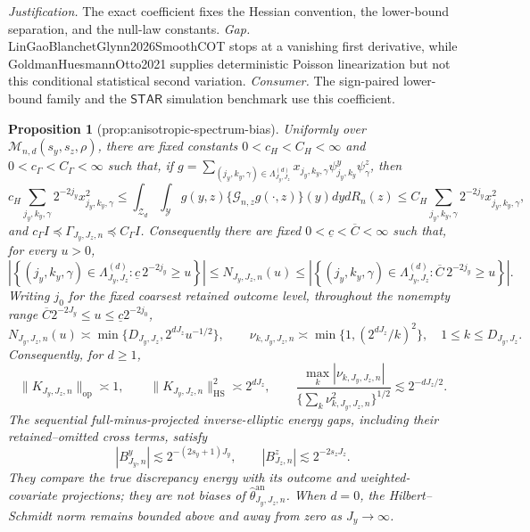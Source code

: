 \documentclass{article}
\newtheorem{proposition}{Proposition}
\begin{document}
\par\smallskip\noindent \textit{Justification.} The exact coefficient fixes the Hessian convention, the lower-bound separation, and the null-law constants. \textit{Gap.} LinGaoBlanchetGlynn2026SmoothCOT stops at a vanishing first derivative, while GoldmanHuesmannOtto2021 supplies deterministic Poisson linearization but not this conditional statistical second variation. \textit{Consumer.} The sign-paired lower-bound family and the \(\mathsf{STAR}\) simulation benchmark use this coefficient.

\begin{proposition}[prop:anisotropic-spectrum-bias]\label{prop:anisotropic-spectrum-bias}
Uniformly over \(\mathcal M_{n,d}(s_y,s_z,\rho)\), there are fixed constants \(0<c_H<C_H<\infty\) and \(0<c_\Gamma<C_\Gamma<\infty\) such that, if \(g=\sum_{(j_y,k_y,\gamma)\in\Lambda_{J_y,J_z}^{(d)}}x_{j_y,k_y,\gamma}\psi^y_{j_y,k_y}\psi^z_\gamma\), then
\[
c_H\sum_{j_y,k_y,\gamma}2^{-2j_y}x_{j_y,k_y,\gamma}^2
\le\int_{\mathcal Z_d}\int_{\mathcal Y}g(y,z)\{\mathcal G_{n,z}g(\cdot,z)\}(y)dydR_n(z)
\le C_H\sum_{j_y,k_y,\gamma}2^{-2j_y}x_{j_y,k_y,\gamma}^2,
\]
and \(c_\Gamma I\preceq\Gamma_{J_y,J_z,n}\preceq C_\Gamma I\). Consequently there are fixed \(0<\underline c<\overline C<\infty\) such that, for every \(u>0\),
\[
\left|\left\{(j_y,k_y,\gamma)\in\Lambda_{J_y,J_z}^{(d)}:\underline c\,2^{-2j_y}\ge u\right\}\right|
\le N_{J_y,J_z,n}(u)
\le
\left|\left\{(j_y,k_y,\gamma)\in\Lambda_{J_y,J_z}^{(d)}:\overline C\,2^{-2j_y}\ge u\right\}\right|.
\]
Writing \(j_0\) for the fixed coarsest retained outcome level, throughout the nonempty range \(\overline C2^{-2J_y}\le u\le\underline c2^{-2j_0}\),
\[
N_{J_y,J_z,n}(u)\asymp\min\{D_{J_y,J_z},2^{dJ_z}u^{-1/2}\},
\qquad
\nu_{k,J_y,J_z,n}\asymp\min\{1,(2^{dJ_z}/k)^2\},\quad 1\le k\le D_{J_y,J_z}.
\]
Consequently, for \(d\ge1\),
\[
\|K_{J_y,J_z,n}\|_{\mathrm{op}}\asymp1,
\qquad \|K_{J_y,J_z,n}\|_{\mathrm{HS}}^2\asymp2^{dJ_z},
\qquad
\frac{\max_k|\nu_{k,J_y,J_z,n}|}{\{\sum_k\nu_{k,J_y,J_z,n}^2\}^{1/2}}
\lesssim2^{-dJ_z/2}.
\]
The sequential full-minus-projected inverse-elliptic energy gaps, including their retained--omitted cross terms, satisfy
\[
|B^y_{J_y,n}|\lesssim2^{-(2s_y+1)J_y},
\qquad
|B^z_{J_z,n}|\lesssim2^{-2s_zJ_z}.
\]
They compare the true discrepancy energy with its outcome and weighted-covariate projections; they are not biases of \(\widehat\theta^{\mathrm{an}}_{J_y,J_z,n}\). When \(d=0\), the Hilbert--Schmidt norm remains bounded above and away from zero as \(J_y\to\infty\).
\end{proposition}
\end{document}
